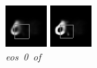 \documentclass{article} %
\begin{document}
\begin{figure}[t]
  \includegraphics[width=\linewidth]{figures/1-0-4.png}
  \caption{\mbox{\textit{eos 0 of}}}
\endminipage\hfill
{}
  \includegraphics[width=\linewidth]{figures/1-0-6.png}

\end{figure}
\end{document}

